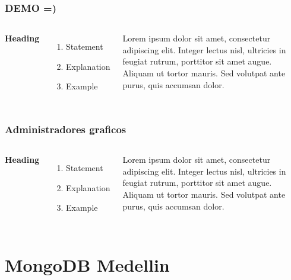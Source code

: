 \documentclass{beamer}
\begin{document}
\begin{frame}
\frametitle{DEMO =)}
\begin{columns}[c] %

\textbf{Heading}
\begin{enumerate}
\item Statement
\item Explanation
\item Example
\end{enumerate}

Lorem ipsum dolor sit amet, consectetur adipiscing elit. Integer lectus nisl, ultricies in feugiat rutrum, porttitor sit amet augue. Aliquam ut tortor mauris. Sed volutpat ante purus, quis accumsan dolor.

\end{columns}
\end{frame}


\begin{frame}
\frametitle{Administradores graficos}
\begin{columns}[c] %

\textbf{Heading}
\begin{enumerate}
\item Statement
\item Explanation
\item Example
\end{enumerate}

Lorem ipsum dolor sit amet, consectetur adipiscing elit. Integer lectus nisl, ultricies in feugiat rutrum, porttitor sit amet augue. Aliquam ut tortor mauris. Sed volutpat ante purus, quis accumsan dolor.

\end{columns}
\end{frame}


\section{MongoDB Medellin}
\end{document}
